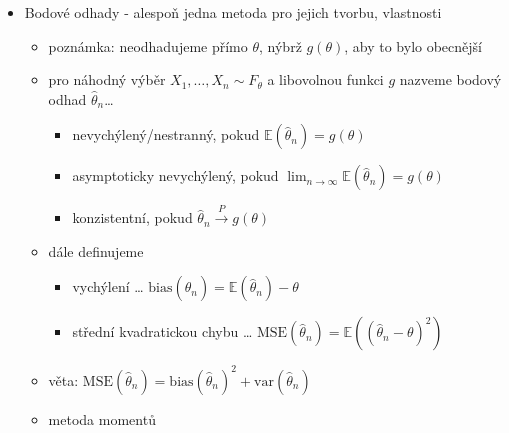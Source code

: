 \begin{itemize}
\begin{itemize}
\item nechť $X_1,X_2,\dots$ jsou stejně rozdělené se střední hodnotou $\mu$ a rozptylem $\sigma^2$
\item označme $Y_n=\frac{(X_1+\dots+X_n)-n\mu}{\sigma\sqrt{n}}$
\item pak $Y_n\xrightarrow d N(0,1)$
\begin{itemize}
\item $Y_n$ konverguje v distribuci k $N(0,1)$
\item tzn. $\lim_{n\to\infty} F_{Y_n}(x)=\Phi(x)$
\end{itemize}
\item CLV se hodí k aproximaci distribuce součtu nebo průměru velkého počtu náhodných veličin normálním rozdělením
\begin{itemize}
\item takže můžeme provádět bodové a intervalové odhady i tam, kde data nejsou normálně rozdělená, ale známe rozptyl
\end{itemize}
\end{itemize}
\item Bodové odhady - alespoň jedna metoda pro jejich tvorbu, vlastnosti
\begin{itemize}
\item poznámka: neodhadujeme přímo $\theta$, nýbrž $g(\theta)$, aby to bylo obecnější
\item pro náhodný výběr $X_1,\dots,X_n\sim F_\theta$ a libovolnou funkci $g$ nazveme bodový odhad $\hat\theta_n$\dots{}
\begin{itemize}
\item nevychýlený/nestranný, pokud $\mathbb E(\hat\theta_n)=g(\theta)$
\item asymptoticky nevychýlený, pokud $\lim_{n\to\infty}\mathbb E(\hat\theta_n)=g(\theta)$
\item konzistentní, pokud $\hat\theta_n\xrightarrow P g(\theta)$
\end{itemize}
\item dále definujeme
\begin{itemize}
\item vychýlení \dots{} $\text{bias}(\hat\theta_n)=\mathbb E(\hat\theta_n)-\theta$
\item střední kvadratickou chybu \dots{} $\text{MSE}(\hat\theta_n)=\mathbb E((\hat\theta_n-\theta)^2)$
\end{itemize}
\item věta: $\text{MSE}(\hat\theta_n)=\text{bias}(\hat\theta_n)^2+\text{var}(\hat\theta_n)$
\item metoda momentů

\end{itemize}
\end{itemize}
